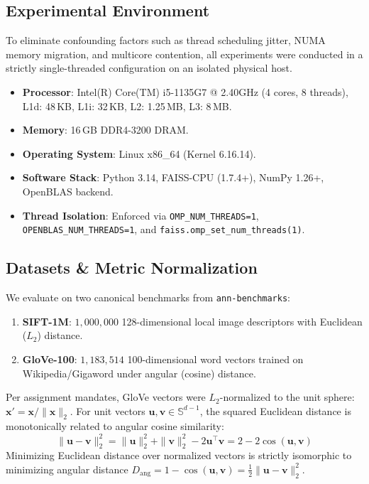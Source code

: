 \documentclass[10pt,twocolumn,a4paper]{article}
\begin{document}
\subsection{Experimental Environment}
To eliminate confounding factors such as thread scheduling jitter, NUMA memory migration, and multicore contention, all experiments were conducted in a strictly single-threaded configuration on an isolated physical host.
\begin{itemize}
    \item \textbf{Processor}: Intel(R) Core(TM) i5-1135G7 @ 2.40GHz (4 cores, 8 threads), L1d: 48\,KB, L1i: 32\,KB, L2: 1.25\,MB, L3: 8\,MB.
    \item \textbf{Memory}: 16\,GB DDR4-3200 DRAM.
    \item \textbf{Operating System}: Linux x86\_64 (Kernel 6.16.14).
    \item \textbf{Software Stack}: Python 3.14, FAISS-CPU (1.7.4+), NumPy 1.26+, OpenBLAS backend.
    \item \textbf{Thread Isolation}: Enforced via \texttt{OMP\_NUM\_THREADS=1}, \texttt{OPENBLAS\_NUM\_THREADS=1}, and \texttt{faiss.omp\_set\_num\_threads(1)}.
\end{itemize}

\subsection{Datasets \& Metric Normalization}
We evaluate on two canonical benchmarks from \texttt{ann-benchmarks}:
\begin{enumerate}
    \item \textbf{SIFT-1M}: $1,000,000$ 128-dimensional local image descriptors with Euclidean ($L_2$) distance.
    \item \textbf{GloVe-100}: $1,183,514$ 100-dimensional word vectors trained on Wikipedia/Gigaword under angular (cosine) distance.
\end{enumerate}
Per assignment mandates, GloVe vectors were $L_2$-normalized to the unit sphere: $\mathbf{x}' = \mathbf{x} / \|\mathbf{x}\|_2$. For unit vectors $\mathbf{u}, \mathbf{v} \in \mathbb{S}^{d-1}$, the squared Euclidean distance is monotonically related to angular cosine similarity:
\begin{equation}
    \|\mathbf{u} - \mathbf{v}\|_2^2 = \|\mathbf{u}\|_2^2 + \|\mathbf{v}\|_2^2 - 2 \mathbf{u}^\top \mathbf{v} = 2 - 2 \cos(\mathbf{u}, \mathbf{v})
\end{equation}
Minimizing Euclidean distance over normalized vectors is strictly isomorphic to minimizing angular distance $D_{\text{ang}} = 1 - \cos(\mathbf{u}, \mathbf{v}) = \frac{1}{2} \|\mathbf{u} - \mathbf{v}\|_2^2$.
\end{document}
